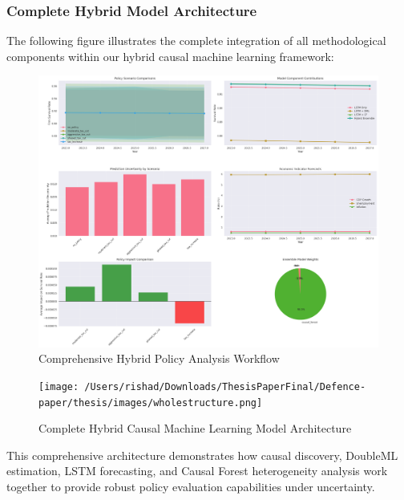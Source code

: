 \subsubsection{Complete Hybrid Model Architecture}
The following figure illustrates the complete integration of all methodological components within our hybrid causal machine learning framework:
\begin{figure}[htbp]
    \centering
    \includegraphics[width=\textwidth]{figures/hybrid_policy_analysis_comprehensive.png}
    \caption{Comprehensive Hybrid Policy Analysis Workflow}
    \label{fig:hybrid_policy_analysis_comprehensive}
\end{figure}

\begin{figure}[htbp]
    \centering
    \texttt{[image: /Users/rishad/Downloads/ThesisPaperFinal/Defence-paper/thesis/images/wholestructure.png]}
    \caption{Complete Hybrid Causal Machine Learning Model Architecture}
    \label{fig:complete_methodology}
\end{figure}

This comprehensive architecture demonstrates how causal discovery, DoubleML estimation, LSTM forecasting, and Causal Forest heterogeneity analysis work together to provide robust policy evaluation capabilities under uncertainty.

